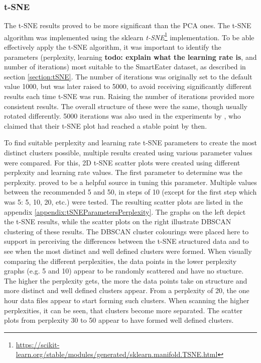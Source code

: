 \subsubsection{t-SNE}
\label{section:experimentTSNE}
The t-SNE results proved to be more significant than the PCA ones. The t-SNE algorithm was implemented using the sklearn \textit{t-SNE}\footnote{\url{https://scikit-learn.org/stable/modules/generated/sklearn.manifold.TSNE.html}} implementation.
To be able effectively apply the t-SNE algorithm, it was important to identify the parameters (perplexity, learning \textbf{todo: explain what the learning rate is}, and number of iterations) most suitable to the SmartEater dataset, as described in section \ref{section:tSNE}. The number of iterations was originally set to the default value 1000, but was later raised to 5000, to avoid receiving significantly different results each time t-SNE was run. Raising the number of iterations provided more consistent results. The overall structure of these were the same, though usually rotated differently. 5000 iterations was also used in the experiments by \textcite{wattenberg2016how}, who claimed that their t-SNE plot had reached a stable point by then.

To find suitable perplexity and learning rate t-SNE parameters to create the most distinct clusters possible, multiple results created using various parameter values were compared. For this, 2D t-SNE scatter plots were created using different perplexity and learning rate values. 
The first parameter to determine was the perplexity. \textcite{wattenberg2016how} proved to be a helpful source in tuning this parameter. Multiple values between the recommended 5 and 50, in steps of 10 (except for the first step which was 5: 5, 10, 20, etc.) were tested. The resulting scatter plots are listed in the appendix \ref{appendix:tSNEParametersPerplexity}. The graphs on the left depict the t-SNE results, while the scatter plots on the right illustrate DBSCAN clustering of these results. The DBSCAN cluster colourings were placed here to support in perceiving the differences between the t-SNE structured data and to see when the most distinct and well defined clusters were formed. When visually comparing the different perplexities, the data points in the lower perplexity graphs (e.g. 5 and 10) appear to be randomly scattered and have no stucture. The higher the perplexity gets, the more the data points take on structure and more distinct and well defined clusters appear. From a perplexity of 20, the one hour data files appear to start forming such clusters. When scanning the higher perplexities, it can be seen, that clusters become more separated. The scatter plots from perplexity 30 to 50 appear to have formed well defined clusters. 

